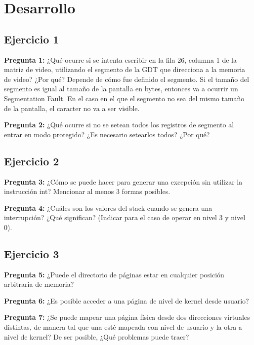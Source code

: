 \documentclass[10pt, a4paper]{article}
\begin{document}
\section{Desarrollo}

\subsection{Ejercicio 1}
{\textbf{Pregunta 1:}} ¿Qué ocurre si se intenta escribir en la fila 26, columna 1 de la matriz de video, utilizando el segmento de la GDT que direcciona a la memoria de video? ¿Por qué?\newline
Depende de cómo fue definido el segmento. Si el tamaño del segmento es igual al tamaño de la pantalla en bytes, entonces va a ocurrir un Segmentation Fault. En el caso en el que el segmento no sea del mismo tamaño de la pantalla, el caracter no va a ser visible.\newline

{\textbf{Pregunta 2:}} ¿Qué ocurre si no se setean todos los registros de segmento al entrar en modo protegido? ¿Es necesario setearlos todos? ¿Por qué?\newline


\subsection{Ejercicio 2}
{\textbf{Pregunta 3:}} ¿Cómo se puede hacer para generar una excepción sin utilizar la instrucción int? Mencionar al menos 3 formas posibles.\newline

{\textbf{Pregunta 4:}} ¿Cuáles son los valores del stack cuando se genera una interrupción? ¿Qué significan? (Indicar para el caso de operar en nivel 3 y nivel 0).\newline


\subsection{Ejercicio 3}
{\textbf{Pregunta 5:}} ¿Puede el directorio de páginas estar en cualquier posición arbitraria de memoria?\newline

{\textbf{Pregunta 6:}} ¿Es posible acceder a una página de nivel de kernel desde usuario?\newline

{\textbf{Pregunta 7:}} ¿Se puede mapear una página física desde dos direcciones virtuales
distintas, de manera tal que una esté mapeada con nivel de usuario y la otra a nivel de kernel? De ser posible, ¿Qué problemas puede traer?\newline
\end{document}
